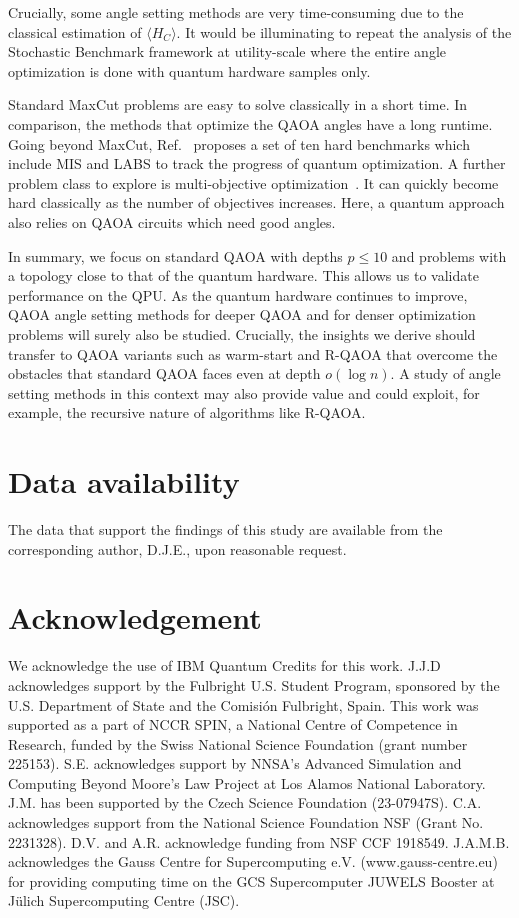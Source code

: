 \documentclass[twocolumn,
english,
aps,
pra,
10pt,
longbibliography,
superscriptaddress,
amsmath,
amssymb,
floatfix
]{revtex4-2}
\begin{document}
{Crucially, some angle setting methods are very time-consuming due to the classical estimation of $\langle H_C\rangle$.
It would be illuminating to repeat the analysis of the Stochastic Benchmark framework at utility-scale where the entire angle optimization is done with quantum hardware samples only.

Standard MaxCut problems are easy to solve classically in a short time.
In comparison, the methods that optimize the QAOA angles have a long runtime.
Going beyond MaxCut, Ref.~\cite{koch2025quantum} proposes a set of ten hard benchmarks which include MIS and LABS to track the progress of quantum optimization.
A further problem class to explore is multi-objective optimization~\cite{Kotil_2025}. It can quickly become hard classically as the number of objectives increases.
Here, a quantum approach also relies on QAOA circuits which need good angles.

In summary, we focus on standard QAOA with depths $p\leq 10$ and problems with a topology close to that of the quantum hardware.
This allows us to validate performance on the QPU.
As the quantum hardware continues to improve, QAOA angle setting methods for deeper QAOA and for denser optimization problems will surely also be studied.
Crucially, the insights we derive should transfer to QAOA variants such as warm-start and R-QAOA that overcome the obstacles that standard QAOA faces even at depth $o(\log n)$.
A study of angle setting methods in this context may also provide value and could exploit, for example, the recursive nature of algorithms like R-QAOA.

\section{Data availability}

The data that support the findings of this study are available from the corresponding author, D.J.E., upon reasonable request.

\section{Acknowledgement}

We acknowledge the use of IBM Quantum Credits for this work.
J.J.D acknowledges support by the Fulbright U.S. Student Program, sponsored by the U.S. Department of State and the Comisión Fulbright, Spain.
This work was supported as a part of NCCR SPIN, a National Centre of Competence in Research, funded by the Swiss National Science Foundation (grant number 225153).
S.E. acknowledges support by NNSA’s Advanced Simulation and
Computing Beyond Moore’s Law Project at Los Alamos
National Laboratory. 
J.M. has been supported by
the Czech Science Foundation (23-07947S). 
C.A. acknowledges support from the National Science Foundation NSF (Grant
No. 2231328). D.V. and A.R. acknowledge funding from NSF CCF 1918549. 
J.A.M.B. acknowledges the Gauss Centre for Supercomputing e.V. (www.gauss-centre.eu) for providing computing time on the GCS Supercomputer JUWELS Booster at Jülich Supercomputing Centre (JSC).


}
\end{document}
